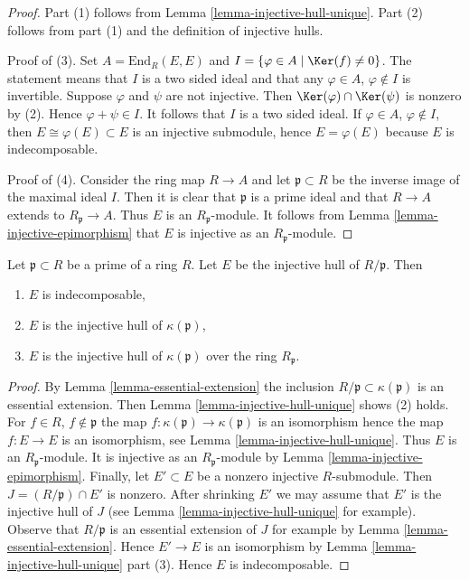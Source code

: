 \begin{proof}
Part (1) follows from Lemma \ref{lemma-injective-hull-unique}.
Part (2) follows from part (1) and the definition of injective hulls.

\medskip\noindent
Proof of (3). Set $A = \text{End}_R(E, E)$ and
$I = \{\varphi \in A \mid \Ker(f) \not = 0\}$.
The statement means that $I$ is a two sided ideal and
that any $\varphi \in A$, $\varphi \not \in I$ is invertible.
Suppose $\varphi$ and $\psi$ are not injective.
Then $\Ker(\varphi) \cap \Ker(\psi)$ is nonzero
by (2). Hence $\varphi + \psi \in I$. It follows that $I$
is a two sided ideal. If $\varphi \in A$, $\varphi \not \in I$,
then $E \cong \varphi(E) \subset E$ is an injective submodule,
hence $E = \varphi(E)$ because $E$ is indecomposable.

\medskip\noindent
Proof of (4). Consider the ring map $R \to A$ and let $\mathfrak p \subset R$
be the inverse image of the maximal ideal $I$. Then it is clear
that $\mathfrak p$ is a prime ideal and that $R \to A$ extends to
$R_\mathfrak p \to A$. Thus $E$ is an $R_\mathfrak p$-module.
It follows from Lemma \ref{lemma-injective-epimorphism} that $E$ is injective
as an $R_\mathfrak p$-module.
\end{proof}

\begin{lemma}
\label{lemma-injective-hull-indecomposable}
Let $\mathfrak p \subset R$ be a prime of a ring $R$.
Let $E$ be the injective hull of $R/\mathfrak p$. Then
\begin{enumerate}
\item $E$ is indecomposable,
\item $E$ is the injective hull of $\kappa(\mathfrak p)$,
\item $E$ is the injective hull of $\kappa(\mathfrak p)$
over the ring $R_\mathfrak p$.
\end{enumerate}
\end{lemma}

\begin{proof}
By Lemma \ref{lemma-essential-extension} the inclusion
$R/\mathfrak p \subset \kappa(\mathfrak p)$ is an essential
extension. Then Lemma \ref{lemma-injective-hull-unique}
shows (2) holds. For $f \in R$, $f \not \in \mathfrak p$
the map $f : \kappa(\mathfrak p) \to \kappa(\mathfrak p)$ is an isomorphism
hence the map $f : E \to E$ is an isomorphism,
see Lemma \ref{lemma-injective-hull-unique}.
Thus $E$ is an $R_\mathfrak p$-module. It is injective
as an $R_\mathfrak p$-module by Lemma \ref{lemma-injective-epimorphism}.
Finally, let $E' \subset E$ be a nonzero injective $R$-submodule.
Then $J = (R/\mathfrak p) \cap E'$ is nonzero. After shrinking $E'$
we may assume that $E'$ is the injective hull of $J$ (see
Lemma \ref{lemma-injective-hull-unique} for example).
Observe that $R/\mathfrak p$ is an essential extension of $J$ for example by
Lemma \ref{lemma-essential-extension}. Hence $E' \to E$
is an isomorphism by Lemma \ref{lemma-injective-hull-unique} part (3).
Hence $E$ is indecomposable.
\end{proof}

